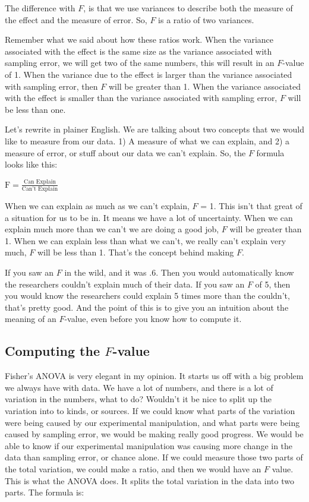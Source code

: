 \documentclass[]{book}
\begin{document}
The difference with \(F\), is that we use variances to describe both the measure of the effect and the measure of error. So, \(F\) is a ratio of two variances.

Remember what we said about how these ratios work. When the variance associated with the effect is the same size as the variance associated with sampling error, we will get two of the same numbers, this will result in an \(F\)-value of 1. When the variance due to the effect is larger than the variance associated with sampling error, then \(F\) will be greater than 1. When the variance associated with the effect is smaller than the variance associated with sampling error, \(F\) will be less than one.

Let's rewrite in plainer English. We are talking about two concepts that we would like to measure from our data. 1) A measure of what we can explain, and 2) a measure of error, or stuff about our data we can't explain. So, the \(F\) formula looks like this:

\(\text{F} = \frac{\text{Can Explain}}{\text{Can't Explain}}\)

When we can explain as much as we can't explain, \(F\) = 1. This isn't that great of a situation for us to be in. It means we have a lot of uncertainty. When we can explain much more than we can't we are doing a good job, \(F\) will be greater than 1. When we can explain less than what we can't, we really can't explain very much, \(F\) will be less than 1. That's the concept behind making \(F\).

If you saw an \(F\) in the wild, and it was .6. Then you would automatically know the researchers couldn't explain much of their data. If you saw an \(F\) of 5, then you would know the researchers could explain 5 times more than the couldn't, that's pretty good. And the point of this is to give you an intuition about the meaning of an \(F\)-value, even before you know how to compute it.

\hypertarget{computing-the-f-value}{%
\subsection{\texorpdfstring{Computing the \(F\)-value}{Computing the F-value}}\label{computing-the-f-value}}

Fisher's ANOVA is very elegant in my opinion. It starts us off with a big problem we always have with data. We have a lot of numbers, and there is a lot of variation in the numbers, what to do? Wouldn't it be nice to split up the variation into to kinds, or sources. If we could know what parts of the variation were being caused by our experimental manipulation, and what parts were being caused by sampling error, we would be making really good progress. We would be able to know if our experimental manipulation was causing more change in the data than sampling error, or chance alone. If we could measure those two parts of the total variation, we could make a ratio, and then we would have an \(F\) value. This is what the ANOVA does. It splits the total variation in the data into two parts. The formula is:
\end{document}
